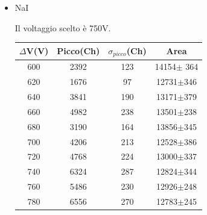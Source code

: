\documentclass[italian,11pt]{report}
\begin{document}
\newpage
\begin{itemize}
    \item NaI 
   
    Il voltaggio scelto è 750V.
    \vspace{1cm}
    \begin{center}
         \begin{tabular}{cccc}
          \hline
          $\Delta$V(V) & Picco(Ch) & $\sigma_{picco}$(Ch) & Area\\
          \hline\hline
          600& 2392 & 123 &14154$\pm$ 364 \\
          620& 1676 & 97 & 12731$\pm$346 \\
          640& 3841 & 190 & 13171$\pm$379 \\
          660& 4982 & 238 & 13501$\pm$238 \\
          680& 3190 & 164 & 13856$\pm$345 \\
         700& 4206 & 213 & 12528$\pm$386 \\
            720& 4768 & 224 & 13000$\pm$337 \\
           740& 6324 & 287 & 12824$\pm$344 \\
          760& 5486 & 230 & 12926$\pm$248 \\
           780& 6556 & 270 & 12783$\pm$245 \\
         \hline 
          \end{tabular}
    \end{center}
    

\end{itemize}
\end{document}
